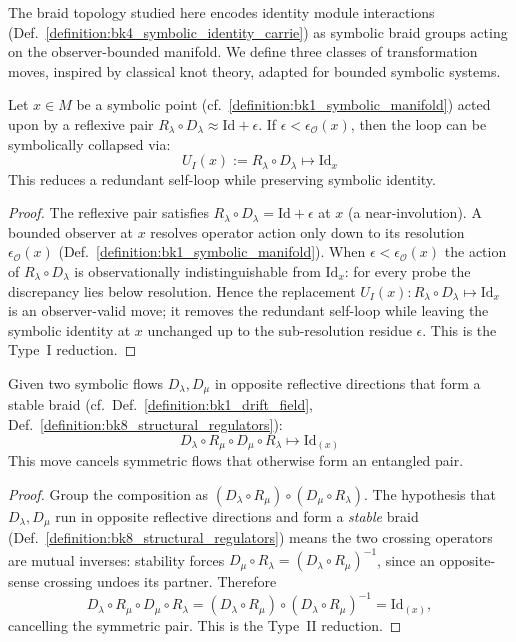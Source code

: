 The braid topology studied here encodes identity module interactions (Def.~\ref{definition:bk4_symbolic_identity_carrie}) as symbolic braid groups acting on the observer-bounded manifold.
We define three classes of transformation moves, inspired by classical knot theory, adapted for bounded symbolic systems.
\begin{proposition}
\label{proposition:bk8_membrane_identity_collapse}
Let \( x \in M \) be a symbolic point (cf.~\ref{definition:bk1_symbolic_manifold}) acted upon by a reflexive pair \( R_\lambda \circ D_\lambda \approx \text{Id} + \epsilon \). If \( \epsilon < \epsilon_\mathcal{O}(x) \), then the loop can be symbolically collapsed via:
\[
U_I(x) := R_\lambda \circ D_\lambda \mapsto \text{Id}_x
\]
This reduces a redundant self-loop while preserving symbolic identity.
\end{proposition}
\begin{proof}
\label{proof:bk8_membrane_identity_collapse}
\leavevmode
The reflexive pair satisfies $R_\lambda\circ D_\lambda=\mathrm{Id}+\epsilon$ at $x$ (a near-involution). A bounded observer at $x$ resolves operator action only down to its resolution $\epsilon_{\mathcal O}(x)$ (Def.~\ref{definition:bk1_symbolic_manifold}). When $\epsilon<\epsilon_{\mathcal O}(x)$ the action of $R_\lambda\circ D_\lambda$ is observationally indistinguishable from $\mathrm{Id}_x$: for every probe the discrepancy lies below resolution. Hence the replacement $U_I(x):R_\lambda\circ D_\lambda\mapsto\mathrm{Id}_x$ is an observer-valid move; it removes the redundant self-loop while leaving the symbolic identity at $x$ unchanged up to the sub-resolution residue $\epsilon$. This is the Type~I reduction.
\end{proof}
\begin{proposition}
\label{proposition:bk8_observer_frame_invariance}
Given two symbolic flows \( D_\lambda, D_\mu \) in opposite reflective
directions that form a stable braid
(cf.~Def.~\ref{definition:bk1_drift_field},
Def.~\ref{definition:bk8_structural_regulators}):
\[
D_\lambda \circ R_\mu \circ D_\mu \circ R_\lambda \mapsto \text{Id}_{(x)}
\]
This move cancels symmetric flows that otherwise form an entangled pair.
\end{proposition}
\begin{proof}
\label{proof:bk8_observer_frame_invariance}
\leavevmode
Group the composition as $(D_\lambda\circ R_\mu)\circ(D_\mu\circ R_\lambda)$. The hypothesis that $D_\lambda,D_\mu$ run in opposite reflective directions and form a \emph{stable} braid (Def.~\ref{definition:bk8_structural_regulators}) means the two crossing operators are mutual inverses: stability forces $D_\mu\circ R_\lambda=(D_\lambda\circ R_\mu)^{-1}$, since an opposite-sense crossing undoes its partner. Therefore
\[
D_\lambda\circ R_\mu\circ D_\mu\circ R_\lambda=(D_\lambda\circ R_\mu)\circ(D_\lambda\circ R_\mu)^{-1}=\mathrm{Id}_{(x)},
\]
cancelling the symmetric pair. This is the Type~II reduction.
\end{proof}
